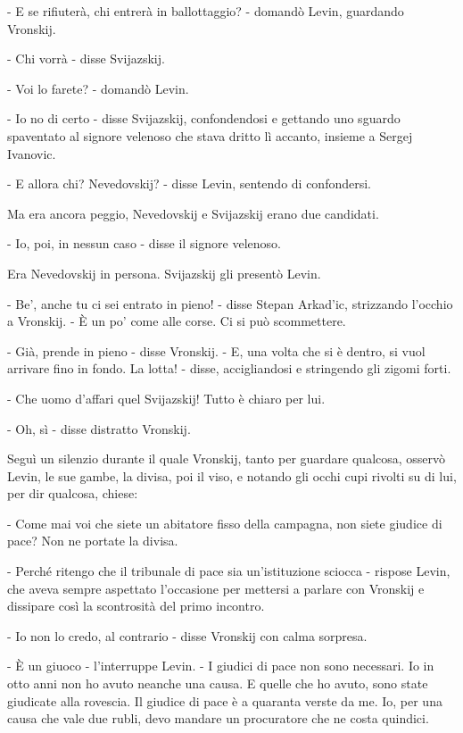 - E se rifiuterà, chi entrerà in ballottaggio? - domandò Levin, guardando Vronskij. 

- Chi vorrà - disse Svijazskij. 

- Voi lo farete? - domandò Levin. 

- Io no di certo - disse Svijazskij, confondendosi e gettando uno sguardo spaventato al signore velenoso che stava dritto lì accanto, insieme a Sergej Ivanovic. 

- E allora chi? Nevedovskij? - disse Levin, sentendo di confondersi. 

Ma era ancora peggio, Nevedovskij e Svijazskij erano due candidati. 

- Io, poi, in nessun caso - disse il signore velenoso. 

Era Nevedovskij in persona. Svijazskij gli presentò Levin. 

- Be', anche tu ci sei entrato in pieno! - disse Stepan Arkad'ic, strizzando l'occhio a Vronskij. - È un po' come alle corse. Ci si può scommettere. 

- Già, prende in pieno - disse Vronskij. - E, una volta che si è dentro, si vuol arrivare fino in fondo. La lotta! - disse, accigliandosi e stringendo gli zigomi forti. 

- Che uomo d'affari quel Svijazskij! Tutto è chiaro per lui. 

- Oh, sì - disse distratto Vronskij. 

Seguì un silenzio durante il quale Vronskij, tanto per guardare qualcosa, osservò Levin, le sue gambe, la divisa, poi il viso, e notando gli occhi cupi rivolti su di lui, per dir qualcosa, chiese: 

- Come mai voi che siete un abitatore fisso della campagna, non siete giudice di pace? Non ne portate la divisa. 

- Perché ritengo che il tribunale di pace sia un'istituzione sciocca - rispose Levin, che aveva sempre aspettato l'occasione per mettersi a parlare con Vronskij e dissipare così la scontrosità del primo incontro. 

- Io non lo credo, al contrario - disse Vronskij con calma sorpresa. 

- È un giuoco - l'interruppe Levin. - I giudici di pace non sono necessari. Io in otto anni non ho avuto neanche una causa. E quelle che ho avuto, sono state giudicate alla rovescia. Il giudice di pace è a quaranta verste da me. Io, per una causa che vale due rubli, devo mandare un procuratore che ne costa quindici. 

